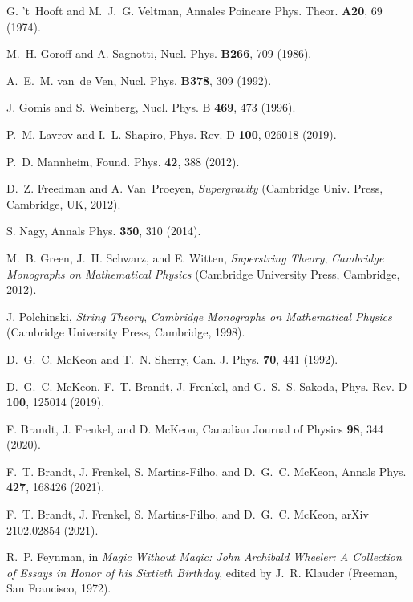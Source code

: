 \documentclass[longbibliography,groupedaddress,showpacs,showkeys,amssymb,eqsecnum,aps,nofootinbib,superscriptaddress]{revtex4}
\begin{document}
% 
\begin{thebibliography}{10}

G. 't~Hooft and M.~J.~G. Veltman, Annales Poincare Phys. Theor. {\bf A20},  69
  (1974).

M.~H. Goroff and A. Sagnotti, Nucl. Phys. {\bf B266},  709  (1986).

A.~E.~M. van~de Ven, Nucl. Phys. {\bf B378},  309  (1992).

J. Gomis and S. Weinberg, Nucl. Phys. B {\bf 469},  473  (1996).

P.~M. Lavrov and I.~L. Shapiro, Phys. Rev. D {\bf 100},  026018  (2019).

P.~D. Mannheim, Found. Phys. {\bf 42},  388  (2012).

D.~Z. Freedman and A. Van~Proeyen, {\em {Supergravity}} (Cambridge Univ. Press,
  Cambridge, UK, 2012).

S. Nagy, Annals Phys. {\bf 350},  310  (2014).

M.~B. Green, J.~H. Schwarz, and E. Witten, {\em Superstring Theory}, {\em
  Cambridge Monographs on Mathematical Physics} (Cambridge University Press,
  Cambridge, 2012).

J. Polchinski, {\em String Theory}, {\em Cambridge Monographs on Mathematical
  Physics} (Cambridge University Press, Cambridge, 1998).

D.~G.~C. McKeon and T.~N. Sherry, Can. J. Phys. {\bf 70},  441  (1992).

D.~G.~C. McKeon, F.~T. Brandt, J. Frenkel, and G.~S.~S. Sakoda, Phys. Rev. D
  {\bf 100},  125014  (2019).

F. Brandt, J. Frenkel, and D. McKeon, Canadian Journal of Physics {\bf 98},
  344  (2020).

F.~T. Brandt, J. Frenkel, S. Martins-Filho, and D.~G.~C. McKeon, Annals Phys.
  {\bf 427},  168426  (2021).

F.~T. Brandt, J. Frenkel, S. Martins-Filho, and D.~G.~C. McKeon, arXiv  2102.02854  (2021).

R.~P. Feynman,  in {\em {Magic Without Magic: John Archibald Wheeler}: {A
  Collection of Essays in Honor of his Sixtieth Birthday}}, edited by J.~R.
  Klauder (Freeman, San Francisco, 1972).


\end{thebibliography}
\end{document}
